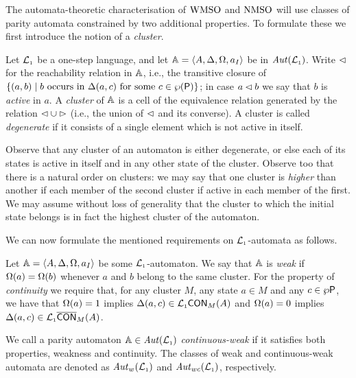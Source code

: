 The automata-theoretic characterisation of $\mathrm{WMSO}$ and $\mathrm{NMSO}$ will use classes 
of parity automata constrained by two additional properties.
To formulate these we first introduce the notion of a \emph{cluster}.

\begin{definition}
\label{d:wk}
\label{d:ctwk}
Let $\mathcal{L}_{\scriptscriptstyle 1}$ be a one-step language, and let $\mathbb{A} = \langle{A,\Delta,\Omega,a_I}\rangle$
be in $\mathit{Aut}(\mathcal{L}_{\scriptscriptstyle 1})$. 
Write $\lhd$ for the reachability relation in $\mathbb{A}$, i.e., the transitive 
closure of $\{ (a,b) \mid b \text{ occurs in }\tmap(a,c) \text{ for 
some } c \in \wp(\props) \}$;
in case $a \lhd b$ we say that $b$ is \emph{active} in $a$.
A \emph{cluster} of $\mathbb{A}$ is a cell of the equivalence relation generated by 
the relation $\lhd \cup \rhd$ (i.e., the union of $\lhd$ and its converse).
A cluster is called \emph{degenerate} if it consists of a  single element which
is not active in itself.
\end{definition}

Observe that any cluster of an automaton is either degenerate, or else each
of its states is active in itself and in any other state of the cluster.
Observe too that there is a natural order on clusters: we may say that one
cluster is \emph{higher} than another if each member of the second cluster
if active in each member of the first.
We may assume without loss of generality that the cluster to which the initial 
state belongs is in fact the highest cluster of the automaton.

We can now formulate the mentioned requirements on $\mathcal{L}_{\scriptscriptstyle 1}$-automata as follows.

\begin{definition}
\label{d:wk}
\label{d:ctwk}
Let $\mathbb{A} = \langle{A,\Delta,\Omega,a_I}\rangle$ be some $\mathcal{L}_{\scriptscriptstyle 1}$-automaton.
We say that $\mathbb{A}$ is \emph{weak} if $\Omega(a) = \Omega(b)$ whenever $a$ and $b$
belong to the same cluster.
For the property of \emph{continuity} we require that, for any cluster $M$, any
state $a \in M$ and any $c \in \wp\mathsf{P}$, we have that 
$\Omega(a) = 1$ implies $\Delta(a,c) \in \mathcal{L}_{\scriptscriptstyle 1}\mathsf{CON}_{M}(A)$
and 
$\Omega(a) = 0$ implies $\Delta(a,c) \in \mathcal{L}_{\scriptscriptstyle 1}\overline{\mathsf{CON}}_{M}(A)$.

We call a parity automaton $\mathbb{A} \in \mathit{Aut}(\mathcal{L}_{\scriptscriptstyle 1})$ \emph{continuous-weak} if it 
satisfies both properties, weakness and continuity.
The classes of weak and continuous-weak automata are denoted as $\mathit{Aut}_{w}(\mathcal{L}_{\scriptscriptstyle 1})$
and $\mathit{Aut}_{wc}(\mathcal{L}_{\scriptscriptstyle 1})$, respectively.
\end{definition}

